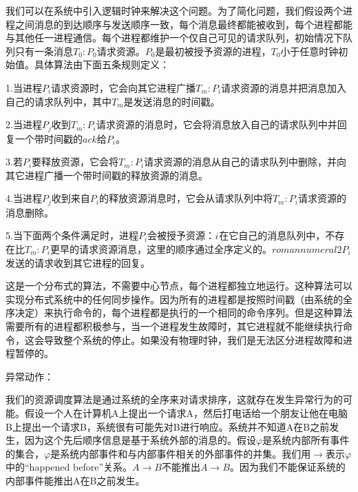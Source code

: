 \documentclass[UTF8]{article}
\begin{document}
	我们可以在系统中引入逻辑时钟来解决这个问题。为了简化问题，我们假设两个进程之间消息的到达顺序与发送顺序一致，每个消息最终都能被收到，每个进程都能与其他任一进程通信。每个进程都维护一个仅自己可见的请求队列，初始情况下队列只有一条消息$T_0:P_0$请求资源。$P_0$是最初被授予资源的进程，$T_0$小于任意时钟初始值。具体算法由下面五条规则定义：

	1.当进程$P_i$请求资源时，它会向其它进程广播$T_m:P_i$请求资源的消息并把消息加入自己的请求队列中，其中$T_m$是发送消息的时间戳。

	2.当进程$P_j$收到$T_m:P_i$请求资源的消息时，它会将消息放入自己的请求队列中并回复一个带时间戳的$ack$给$P_i$。

	3.若$P_i$要释放资源，它会将$T_m:P_i$请求资源的消息从自己的请求队列中删除，并向其它进程广播一个带时间戳的释放资源的消息。

	4.当进程$P_j$收到来自$P_i$的释放资源消息时，它会从请求队列中将$T_m:P_i$请求资源的消息删除。
	
	5.当下面两个条件满足时，进程$P_i$会被授予资源：$\romannumeral1$在它自己的消息队列中，不存在比$T_m:P_i$更早的请求资源消息，这里的顺序通过全序定义的。$romannumeral2$$P_i$发送的请求收到其它进程的回复。

	这是一个分布式的算法，不需要中心节点，每个进程都独立地运行。这种算法可以实现分布式系统中的任何同步操作。因为所有的进程都是按照时间戳（由系统的全序决定）来执行命令的，每个进程都是执行的一个相同的命令序列。但是这种算法需要所有的进程都积极参与，当一个进程发生故障时，其它进程就不能继续执行命令，这会导致整个系统的停止。如果没有物理时钟，我们是无法区分进程故障和进程暂停的。

	异常动作：

	我们的资源调度算法是通过系统的全序来对请求排序，这就存在发生异常行为的可能。假设一个人在计算机A上提出一个请求A，然后打电话给一个朋友让他在电脑B上提出一个请求B，系统很有可能先对B进行响应。系统并不知道A在B之前发生，因为这个先后顺序信息是基于系统外部的消息的。假设$\varphi$是系统内部所有事件的集合，\underline{$\varphi$}是系统内部事件和与内部事件相关的外部事件的并集。我们用$\boldsymbol{\rightarrow}$表示\underline{$\varphi$}中的“happened before”关系。$A \boldsymbol{\rightarrow} B$不能推出$A \rightarrow B$。因为我们不能保证系统的内部事件能推出A在B之前发生。

\end{document}
